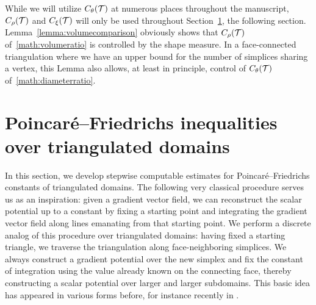 \documentclass[10pt,a4paper]{article}
\begin{document}
\begin{remark}
    While we will utilize $C_\theta({\mathcal T})$ at numerous places throughout the manuscript, 
    $C_\rho({\mathcal T})$ and $C_\xi({\mathcal T})$ will only be used throughout Section~\ref{section:gradient},
    the following section.  
    Lemma~\ref{lemma:volumecomparison} obviously shows that $C_\rho({\mathcal T})$ of~\eqref{math:volumeratio} is controlled by the shape measure. In a face-connected triangulation where we have an upper bound for the number of simplices sharing a vertex, 
    this Lemma also allows, at least in principle, control of $C_\theta({\mathcal T})$ of~\eqref{math:diameterratio}.
\end{remark}










































\section{Poincar\'e--Friedrichs inequalities over triangulated domains}\label{section:gradient}

In this section, we develop stepwise computable estimates for Poincar\'e--Friedrichs constants of triangulated domains. 
The following very classical procedure serves us as an inspiration: given a gradient vector field, we can reconstruct the scalar potential up to a constant by fixing a starting point and integrating the gradient vector field along lines emanating from that starting point. 
We perform a discrete analog of this procedure over triangulated domains: 
having fixed a starting triangle, we traverse the triangulation along face-neighboring simplices.
We always construct a gradient potential over the new simplex and fix the constant of integration using the value already known on the connecting face, thereby constructing a scalar potential over larger and larger subdomains.
This basic idea has appeared in various forms before, for instance recently in \cite{Brae_Pill_Sch_p_rob_09, ern2020stable, Chaum_Voh_p_rob_3D_H_curl_24, Voh_loc_glob_H1_24}.
\end{document}

